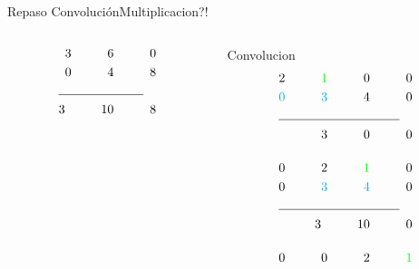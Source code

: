\begin{frame}{Repaso Convolución}{Multiplicacion?!}
\begin{columns}[t]
\begin{column}{.3\textwidth}
\begin{align*}
               3\hspace{1cm} 6 \hspace{1cm}0\\
               0\hspace{1cm} 4 \hspace{1cm}8\\
               \cline{1-2}
               3 \hspace{1cm}10 \hspace{1cm} 8\\
            \end{align*}
      \end{column}
      \hspace{2pt}
      \vrule
      \hspace{2pt}
      \begin{column}{.3\textwidth}
      \tiny
      Convolucion
            \begin{align*}
                                2 \hspace{1cm} \textcolor{green}{1}\hspace{1cm}0 \hspace{1cm}0\\
               \textcolor{cyan}{0}\hspace{1cm} \textcolor{cyan} {3}\hspace{1cm}4 \hspace{1cm}0\\
               \cline{1-2}
               3\hspace{1cm} 0\hspace{1cm}0\\[0.4cm]
               0\hspace{1cm}                  2 \hspace{1cm}\textcolor{green}{1} \hspace{1cm}0\\
               0\hspace{1cm} \textcolor{cyan}{3}\hspace{1cm}\textcolor{cyan} {4} \hspace{1cm}0\\
               \cline{1-2}
               3\hspace{1cm} 10\hspace{1cm}0\\[0.4cm]
               0\hspace{1cm} 0\hspace{1cm}                 2 \hspace{1cm}\textcolor{green}{1}\\

\end{align*}
\end{column}
\end{columns}
\end{frame}
